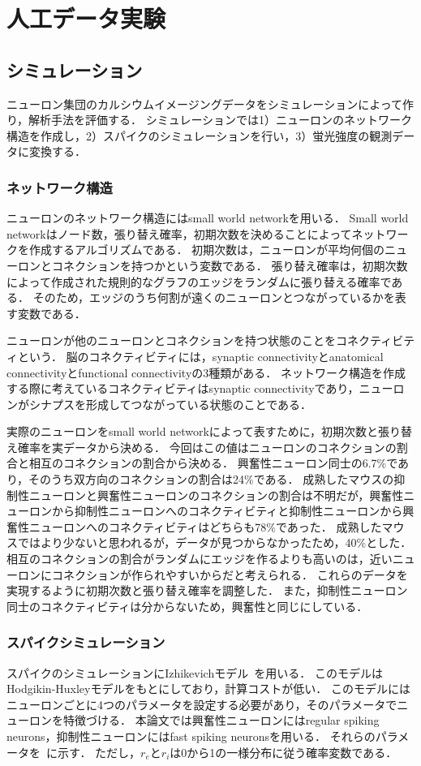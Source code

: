 \chapter{人工データ実験}
\section{シミュレーション}
ニューロン集団のカルシウムイメージングデータをシミュレーションによって作り，解析手法を評価する．
シミュレーションでは1）ニューロンのネットワーク構造を作成し，2）スパイクのシミュレーションを行い，3）蛍光強度の観測データに変換する．
\subsection{ネットワーク構造}
ニューロンのネットワーク構造にはsmall world network\cite{Watts1998}を用いる．
Small world networkはノード数，張り替え確率，初期次数を決めることによってネットワークを作成するアルゴリズムである．
初期次数は，ニューロンが平均何個のニューロンとコネクションを持つかという変数である．
張り替え確率は，初期次数によって作成された規則的なグラフのエッジをランダムに張り替える確率である．
そのため，エッジのうち何割が遠くのニューロンとつながっているかを表す変数である．

ニューロンが他のニューロンとコネクションを持つ状態のことをコネクティビティという．
脳のコネクティビティには，synaptic connectivityとanatomical connectivityとfunctional connectivityの3種類がある．
ネットワーク構造を作成する際に考えているコネクティビティはsynaptic connectivityであり，ニューロンがシナプスを形成してつながっている状態のことである．

実際のニューロンをsmall world networkによって表すために，初期次数と張り替え確率を実データから決める．
今回はこの値はニューロンのコネクションの割合と相互のコネクションの割合から決める．
興奮性ニューロン同士の6.7\%であり，そのうち双方向のコネクションの割合は24\%である\cite{}．
成熟したマウスの抑制性ニューロンと興奮性ニューロンのコネクションの割合は不明だが，興奮性ニューロンから抑制性ニューロンへのコネクティビティと抑制性ニューロンから興奮性ニューロンへのコネクティビティはどちらも78\%であった\cite{Holmgren2003}．
成熟したマウスではより少ないと思われるが，データが見つからなかったため，40\%とした．
相互のコネクションの割合がランダムにエッジを作るよりも高いのは，近いニューロンにコネクションが作られやすいからだと考えられる．
これらのデータを実現するように初期次数と張り替え確率を調整した．
また，抑制性ニューロン同士のコネクティビティは分からないため，興奮性と同じにしている．
\subsection{スパイクシミュレーション}
スパイクのシミュレーションにIzhikevichモデル~\cite{Izhikevich2003}を用いる．
このモデルはHodgikin-Huxleyモデルをもとにしており，計算コストが低い．
このモデルにはニューロンごとに4つのパラメータを設定する必要があり，そのパラメータでニューロンを特徴づける．
本論文では興奮性ニューロンにはregular spiking neurons，抑制性ニューロンにはfast spiking neuronsを用いる．
それらのパラメータを~に示す．
ただし，$r_e$と$r_i$は0から1の一様分布に従う確率変数である．

